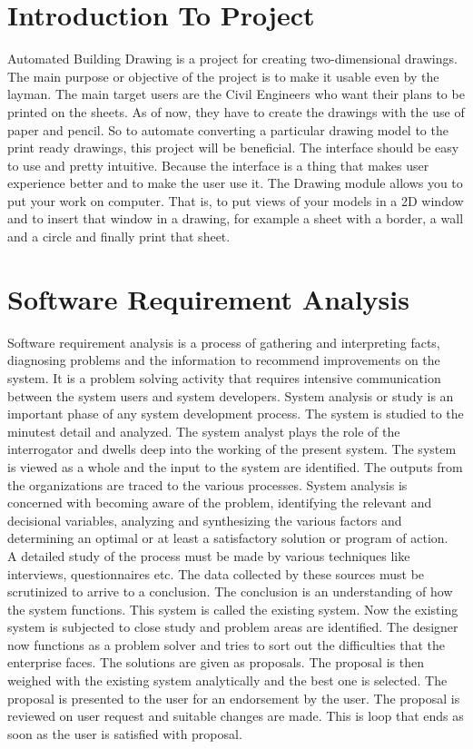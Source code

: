 \section{Introduction To Project} 
\noindent Automated Building Drawing is a project for creating two-dimensional drawings. The main purpose or objective of the project is to make it usable even by the layman. The main target users are the Civil Engineers who want their plans to be printed on the sheets. As of now, they have to create the drawings with the use of paper and pencil. So to automate converting a particular drawing model to the print ready drawings, this project will be beneficial. The interface should be easy
to use and pretty intuitive. Because the interface is a thing that makes user experience better and to make the user use it.
The Drawing module allows you to put your work on computer. That is, to put views of your
models in a 2D window and to insert that window in a drawing, for example a sheet with a border, a wall and a circle and finally print that sheet. 

\section{Software Requirement Analysis}
Software requirement analysis is a process of gathering and interpreting facts, diagnosing problems and the information to recommend improvements on the system. It is a problem solving activity that requires intensive communication between the system users and system developers. System analysis or study is an important phase of any system development process. The system is studied to the minutest detail and analyzed. The system analyst plays the role of the interrogator and dwells deep into the working of the present system. The system is viewed as a whole and the input to the system are identified. The outputs from the organizations are traced to the various processes. System analysis is concerned with becoming aware of the problem, identifying the relevant and decisional variables, analyzing and synthesizing the various factors and determining an optimal or at least a satisfactory solution or program of action.\\

\noindent A detailed study of the process must be made by various techniques like interviews, questionnaires etc. The data collected by these sources must be scrutinized to arrive to a conclusion. The conclusion is an understanding of how the system functions. This system is called the existing system. Now the existing system is subjected to close study and problem areas are identified. The designer now functions as a problem solver and tries to sort out the difficulties that the enterprise faces. The solutions are given as proposals. The proposal is then weighed with the existing system analytically and the best one is selected. The proposal is presented to the user for an endorsement by the user. The proposal is reviewed on user request and suitable changes are made. This is loop that ends as soon as the user is satisfied with proposal.\\

